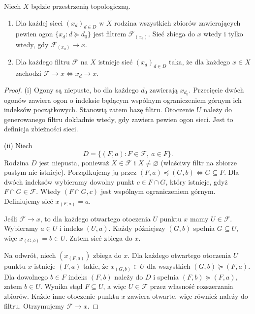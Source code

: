 \begin{twierdzenie}
\label{thm:topog-sieci-filtry}
Niech $X$ będzie przestrzenią topologiczną.
\begin{enumerate}[label=(\roman*)]
\item Dla każdej sieci $(x_d)_{d\in D}$ w $X$
rodzina wszystkich zbiorów zawierających
pewien ogon $\{x_d:d\succeq d_0\}$
jest filtrem $\mathcal F_{(x_d)}$.
Sieć zbiega do $x$ wtedy i tylko wtedy,
gdy $\mathcal F_{(x_d)}\to x$.
\item Dla każdego filtru $\mathcal F$ na $X$
istnieje sieć $(x_d)_{d\in D}$ taka, że dla każdego
$x\in X$ zachodzi
$\mathcal F\to x\iff x_d\to x$.
\end{enumerate}
\end{twierdzenie}
\begin{proof}
(i) Ogony są niepuste, bo dla każdego $d_0$
zawierają $x_{d_0}$. Przecięcie dwóch ogonów
zawiera ogon o indeksie będącym wspólnym
ograniczeniem górnym ich indeksów początkowych.
Stanowią zatem bazę filtru. Otoczenie $U$ należy
do generowanego filtru dokładnie wtedy, gdy zawiera
pewien ogon sieci. Jest to definicja zbieżności sieci.

(ii) Niech
\[
 D=\{(F,a):F\in\mathcal F,\ a\in F\}.
\]
Rodzina $D$ jest niepusta, ponieważ $X\in\mathcal F$
i $X\ne\varnothing$ (właściwy filtr na zbiorze pustym
nie istnieje). Porządkujemy ją przez
$(F,a)\preceq(G,b)\iff G\subseteq F$.
Dla dwóch indeksów wybieramy dowolny punkt
$c\in F\cap G$, który istnieje, gdyż
$F\cap G\in\mathcal F$. Wtedy $(F\cap G,c)$
jest wspólnym ograniczeniem górnym.
Definiujemy sieć $x_{(F,a)}=a$.

Jeśli $\mathcal F\to x$, to dla każdego otwartego
otoczenia $U$ punktu $x$ mamy $U\in\mathcal F$.
Wybieramy $a\in U$ i indeks $(U,a)$. Każdy późniejszy
$(G,b)$ spełnia $G\subseteq U$, więc $x_{(G,b)}=b\in U$.
Zatem sieć zbiega do $x$.

Na odwrót, niech $(x_{(F,a)})$ zbiega do $x$.
Dla każdego otwartego otoczenia $U$ punktu $x$
istnieje $(F,a)$ takie, że
$x_{(G,b)}\in U$ dla wszystkich $(G,b)\succeq(F,a)$.
Dla dowolnego $b\in F$ indeks $(F,b)$ należy do $D$
i spełnia $(F,b)\succeq(F,a)$, zatem $b\in U$.
Wynika stąd $F\subseteq U$, a więc $U\in\mathcal F$
przez własność rozszerzania zbiorów. Każde inne
otoczenie punktu $x$ zawiera otwarte, więc również
należy do filtru. Otrzymujemy $\mathcal F\to x$.
\end{proof}

